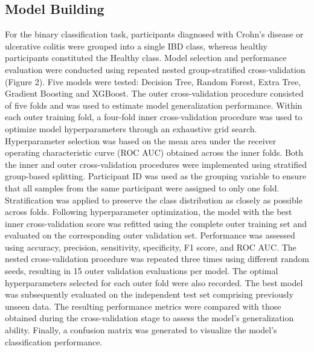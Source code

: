 \documentclass[twoside,twocolumn,10pt]{article}
\begin{document}
\subsection{Model Building}
For the binary classification task, participants diagnosed with Crohn's disease or ulcerative colitis were grouped into a single IBD class, whereas healthy participants constituted the Healthy class. Model selection and performance evaluation were conducted using repeated nested group-stratified cross-validation (Figure 2). Five models were tested: Decision Tree, Random Forest, Extra Tree, Gradient Boosting and XGBoost. The outer cross-validation procedure consisted of five folds and was used to estimate model generalization performance. Within each outer training fold, a four-fold inner cross-validation procedure was used to optimize model hyperparameters through an exhaustive grid search. Hyperparameter selection was based on the mean area under the receiver operating characteristic curve (ROC AUC) obtained across the inner folds. Both the inner and outer cross-validation procedures were implemented using stratified group-based splitting. Participant ID was used as the grouping variable to ensure that all samples from the same participant were assigned to only one fold. Stratification was applied to preserve the class distribution as closely as possible across folds. Following hyperparameter optimization, the model with the best inner cross-validation score was refitted using the complete outer training set and evaluated on the corresponding outer validation set. Performance was assessed using accuracy, precision, sensitivity, specificity, F1 score, and ROC AUC. The nested cross-validation procedure was repeated three times using different random seeds, resulting in 15 outer validation evaluations per model. The optimal hyperparameters selected for each outer fold were also recorded. The best model was subsequently evaluated on the independent test set comprising previously unseen data. The resulting performance metrics were compared with those obtained during the cross-validation stage to assess the model's generalization ability. Finally, a confusion matrix was generated to visualize the model's classification performance. 
\end{document}
